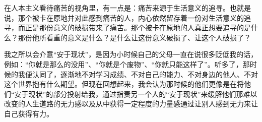 在人本主义看待痛苦的视角里，有一点是：痛苦来源于生活意义的追寻。也就是说，那个被卡在原地并对此感到痛苦的人，内心依然留存着一份对生活意义的追寻，而正是那份意义的破损带来了痛苦。那个被卡在原地的人真正想要追寻的是什么？那份他所看重的意义是什么？是什么让这份意义破损了、让这个人破损了？

我之所以会介意“安于现状”，是因为小时候自己的父母一直在说很多贬低我的话，例如：“你就是那么的没用”、“你就是个废物”、“你就只能这样了”。听多了，那时候的我便认同了，逐渐地不对学习成绩、不对自己的能力、不对身边的他人、不对这个世界抱有什么期望。但现在回想起来，我会认为那时候的他们更像是在将他们“安于现状”的部分投射给我，通过指责另一个人的“安于现状”来缓解他们那难以改变的人生道路的无力感以及从中获得一定程度的力量感\pozhehao{}通过让别人感到无力来让自己获得有力。


